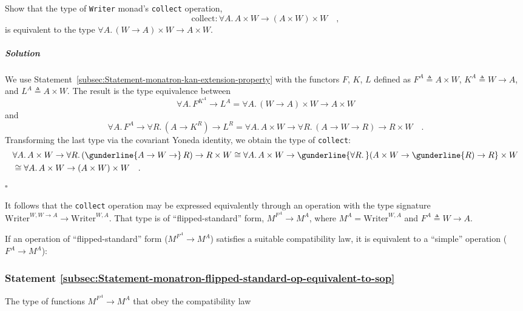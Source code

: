 Show that the type of \lstinline!Writer! monad\textsf{'}s \lstinline!collect!
operation,
\[
\text{collect}:\forall A.\,A\times W\rightarrow(A\times W)\times W\quad,
\]
is equivalent to the type $\forall A.\,(W\rightarrow A)\times W\rightarrow A\times W$. 

\subparagraph{Solution}

We use Statement~\ref{subsec:Statement-monatron-kan-extension-property}
with the functors $F$, $K$, $L$ defined as $F^{A}\triangleq A\times W$,
$K^{A}\triangleq W\rightarrow A$, and $L^{A}\triangleq A\times W$.
The result is the type equivalence between
\[
\forall A.\,F^{K^{A}}\rightarrow L^{A}=\forall A.\,\left(W\rightarrow A\right)\times W\rightarrow A\times W
\]
and
\[
\forall A.\,F^{A}\rightarrow\forall R.\,(A\rightarrow K^{R})\rightarrow L^{R}=\forall A.\,A\times W\rightarrow\forall R.\,(A\rightarrow W\rightarrow R)\rightarrow R\times W\quad.
\]
Transforming the last type via the covariant Yoneda identity, we obtain
the type of \lstinline!collect!:
\begin{align*}
 & \forall A.\,A\times W\rightarrow\forall R.\,(\gunderline{A\rightarrow W\rightarrow}\,R)\rightarrow R\times W\cong\forall A.\,A\times W\rightarrow\gunderline{\forall R.\,}(A\times W\rightarrow\gunderline{R)\rightarrow R}\times W\\
 & \cong\forall A.\,A\times W\rightarrow\left(A\times W\right)\times W\quad.
\end{align*}
$\square$

It follows that the \lstinline!collect! operation may be expressed
equivalently through an operation with the type signature $\text{Writer}^{W,W\rightarrow A}\rightarrow\text{Writer}^{W,A}$.
That type is of \textsf{``}flipped-standard\textsf{''} form, $M^{F^{A}}\rightarrow M^{A}$,
where $M^{A}=\text{Writer}^{W,A}$ and $F^{A}\triangleq W\rightarrow A$.

If an operation of \textsf{``}flipped-standard\textsf{''} form ($M^{F^{A}}\rightarrow M^{A}$)
satisfies a suitable compatibility law, it is equivalent to a \textsf{``}simple\textsf{''}
operation ($F^{A}\rightarrow M^{A}$):

\subsubsection{Statement \label{subsec:Statement-monatron-flipped-standard-op-equivalent-to-sop}\ref{subsec:Statement-monatron-flipped-standard-op-equivalent-to-sop}}

The type of functions $M^{F^{A}}\rightarrow M^{A}$ that obey the
compatibility law

